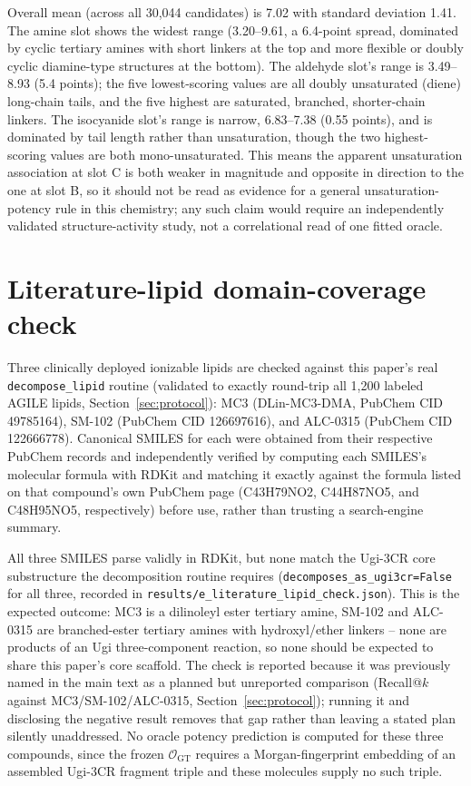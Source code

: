 Overall mean (across all 30,044 candidates) is 7.02 with standard deviation 1.41. The amine slot shows the widest range (3.20--9.61, a 6.4-point spread, dominated by cyclic tertiary amines with short linkers at the top and more flexible or doubly cyclic diamine-type structures at the bottom). The aldehyde slot's range is 3.49--8.93 (5.4 points); the five lowest-scoring values are all doubly unsaturated (diene) long-chain tails, and the five highest are saturated, branched, shorter-chain linkers. The isocyanide slot's range is narrow, 6.83--7.38 (0.55 points), and is dominated by tail length rather than unsaturation, though the two highest-scoring values are both mono-unsaturated. This means the apparent unsaturation association at slot C is both weaker in magnitude and opposite in direction to the one at slot B, so it should not be read as evidence for a general unsaturation-potency rule in this chemistry; any such claim would require an independently validated structure-activity study, not a correlational read of one fitted oracle.

\section{Literature-lipid domain-coverage check}
\label{app:lit-lipids}
Three clinically deployed ionizable lipids are checked against this paper's real \texttt{decompose\_lipid} routine (validated to exactly round-trip all 1,200 labeled AGILE lipids, Section~\ref{sec:protocol}): MC3 (DLin-MC3-DMA, PubChem CID 49785164), SM-102 (PubChem CID 126697616), and ALC-0315 (PubChem CID 122666778). Canonical SMILES for each were obtained from their respective PubChem records and independently verified by computing each SMILES's molecular formula with RDKit and matching it exactly against the formula listed on that compound's own PubChem page (C43H79NO2, C44H87NO5, and C48H95NO5, respectively) before use, rather than trusting a search-engine summary.

All three SMILES parse validly in RDKit, but none match the Ugi-3CR core substructure the decomposition routine requires (\texttt{decomposes\_as\_ugi3cr=False} for all three, recorded in \texttt{results/e\_literature\_lipid\_check.json}). This is the expected outcome: MC3 is a dilinoleyl ester tertiary amine, SM-102 and ALC-0315 are branched-ester tertiary amines with hydroxyl/ether linkers -- none are products of an Ugi three-component reaction, so none should be expected to share this paper's core scaffold. The check is reported because it was previously named in the main text as a planned but unreported comparison (Recall@$k$ against MC3/SM-102/ALC-0315, Section~\ref{sec:protocol}); running it and disclosing the negative result removes that gap rather than leaving a stated plan silently unaddressed. No oracle potency prediction is computed for these three compounds, since the frozen $\mathcal O_{\mathrm{GT}}$ requires a Morgan-fingerprint embedding of an assembled Ugi-3CR fragment triple and these molecules supply no such triple.

